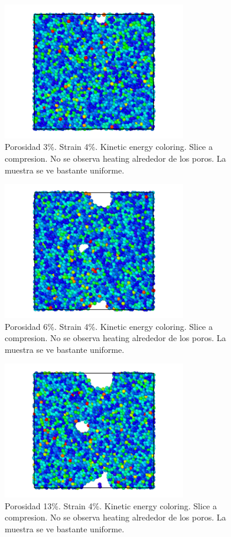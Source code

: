 \documentclass[10pt, oneside]{article} %
\begin{document}
\begin{figure}[H]
\centering
\includegraphics[width=8cm]{Figures/porosidad_3_kinetic_4strain.png}
\caption{Porosidad 3\%. Strain 4\%. Kinetic energy coloring. Slice a compresion. No se observa heating alrededor de los poros. La muestra se ve bastante uniforme.}
\end{figure}

\begin{figure}[H]
\centering
\includegraphics[width=8cm]{Figures/porosidad_6_kinetic_4strain.png}
\caption{Porosidad 6\%. Strain 4\%. Kinetic energy coloring. Slice a compresion. No se observa heating alrededor de los poros. La muestra se ve bastante uniforme.}
\end{figure}

\begin{figure}[H]
\centering
\includegraphics[width=8cm]{Figures/porosidad_13_kinetic_4strain.png}
\caption{Porosidad 13\%. Strain 4\%. Kinetic energy coloring. Slice a compresion. No se observa heating alrededor de los poros. La muestra se ve bastante uniforme.}
\end{figure}
\end{document}

